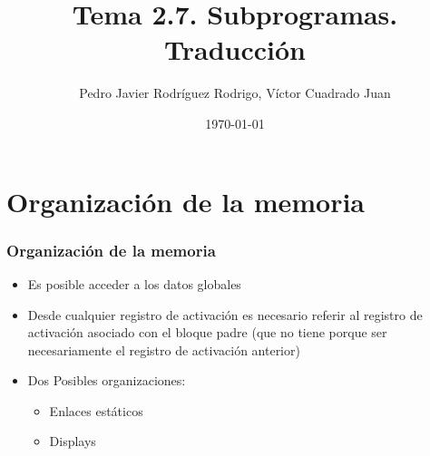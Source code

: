 \documentclass[hyperref={pdfpagelabels=false},tree-dvips]{beamer}
\title{Tema 2.7. Subprogramas. Traducción}
\author{Pedro Javier Rodríguez Rodrigo, Víctor Cuadrado Juan}
\date{\today}
\begin{document}
\begin{frame}
\titlepage
\end{frame}
\section{Organización de la memoria}
\begin{frame}[fragile]
\frametitle{Organización de la memoria}

\begin{itemize}[<+->]%
	\item Es posible acceder a los datos globales
	\item Desde cualquier registro de activación es necesario referir al registro de activación asociado con el bloque padre (que no tiene porque ser necesariamente el registro de activación anterior)
	\item Dos Posibles organizaciones:
		\begin{itemize}[<+->]
			\item Enlaces estáticos
			\item Displays
		\end{itemize}
\end{itemize}

\end{frame}
\end{document}
